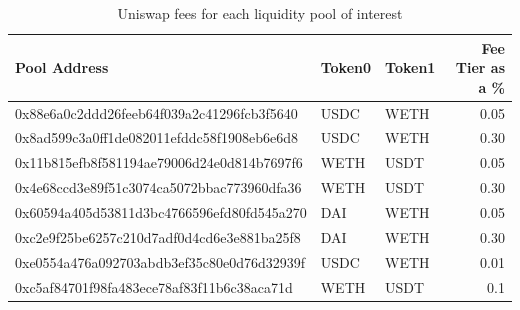 \begin{table}[!htb]
    \begin{tabular}{|l|l|l|r|}
        \hline
                                      Pool Address & Token0 & Token1 &  Fee Tier as a \% \\\hline\hline
        0x88e6a0c2ddd26feeb64f039a2c41296fcb3f5640 &   USDC &   WETH &     0.05 \\\hline
        0x8ad599c3a0ff1de082011efddc58f1908eb6e6d8 &   USDC &   WETH &     0.30 \\\hline
        0x11b815efb8f581194ae79006d24e0d814b7697f6 &   WETH &   USDT &     0.05 \\\hline
        0x4e68ccd3e89f51c3074ca5072bbac773960dfa36 &   WETH &   USDT &     0.30 \\\hline
        0x60594a405d53811d3bc4766596efd80fd545a270 &    DAI &   WETH &     0.05 \\\hline
        0xc2e9f25be6257c210d7adf0d4cd6e3e881ba25f8 &    DAI &   WETH &     0.30 \\\hline
        0xe0554a476a092703abdb3ef35c80e0d76d32939f &   USDC &   WETH &     0.01 \\\hline
        0xc5af84701f98fa483ece78af83f11b6c38aca71d &   WETH &   USDT &     0.1  \\\hline
    \end{tabular}
    \caption{Uniswap fees for each liquidity pool of interest \label{tab:uniswap-fees}}
\end{table}

